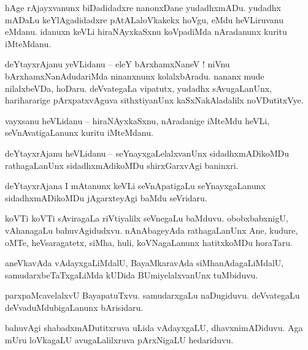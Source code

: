 \documentclass{article}
\begin{document}
\begin{mng}%
hAge rAjayxvanunx biDadidadxre nanonxDane yudadhxmADu. yudadhx mADaLu keYlAgadidadxre 
pAtALaloVkakekx hoVgu, eMdu heVLiruvanu eMdanu. idanuxn keVLi hiraNAyxkaSxnu koVpadiMda nAradanunx 
kuritu iMteMdanu.
\end{mng}

\begin{mng}%
deYtayxrAjanu yeVLidanu -- eleY bArxhamxNaneV ! niVnu bArxhamxNanAdudariMda ninanxnunx 
kolalxbAradu. nananx mude nilalxbeVDa, hoDaru. deVvategaLa vipatutx, yudadhx sAvugaLanUnx, 
harihararige pArxpatxvAguva sithxtiyanUnx kaSxNakAladalilx noVDutitxVye.
\end{mng}

\begin{mng}%
vayxsanu heVLidanu -- hiraNAyxkaSxnu, nAradanige iMteMdu heVLi, seVnAvatigaLanunx kuritu iMteMdanu.
\end{mng}

\begin{mng}%
deYtayxrAjanu heVLidanu -- seYnayxgaLelalxvanUnx sidadhxmADikoMDu rathagaLanUnx sidadhxmAdikoMDu  
shirxGarxvAgi baninxri.
\end{mng}

\begin{mng}%
deYtayxrAjana I mAtanunx keVLi seVnApatigaLu seYnayxgaLanunx sidadhxmADikoMDu jAgarxteyAgi baMdu 
seVridaru.
\end{mng}

\begin{mng}%
koVTi koVTi sAviragaLa riVtiyalilx seVnegaLu baMduvu. obobxbabxnigU, vAhanagaLu bahuvAgidudxvu. 
nAnAbageyAda rathagaLanUnx Ane, kudure, oMTe, heVsaragatetx, siMha, huli, koVNagaLanunx 
hatitxkoMDu horaTaru.
\end{mng}

\begin{mng}%
aneVkavAda vAdayxgaLiMdalU, BayaMkaravAda siMhanAdagaLiMdalU, samudarxbeTaTxgaLiMda kUDida 
BUmiyelalxvanUnx tuMbiduvu.
\end{mng}

\begin{mng}%
parxpaMcavelalxvU BayapatuTxvu. samudarxgaLu naDugiduvu. deVvategaLu deVvaduMdubigaLanunx bArisidaru.
\end{mng}

\begin{mng}%
bahuvAgi shabadxmADutitxruva uLida vAdayxgaLU, dhavxnimADiduvu. Aga mUru loVkagaLU avugaLalilxruva 
pArxNigaLU hedariduvu.
\end{mng}
\end{document}
